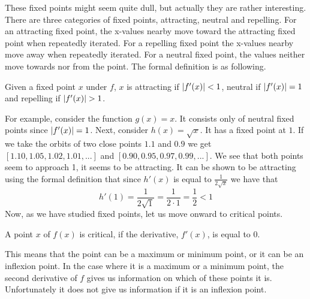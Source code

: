 These fixed points might seem quite dull, but actually they are rather interesting. There are three categories of fixed points, attracting, neutral and repelling. For an attracting fixed point, the x-values nearby move toward the attracting fixed point when repeatedly iterated. For a repelling fixed point the x-values nearby move away when repeatedly iterated. For a neutral fixed point, the values neither move towards nor from the point. The formal definition is as following.

\begin{definition}
Given a fixed point $x$ under $f$, $x$ is attracting if $\abs{f'(x)}<1$, neutral if $\abs{f'(x)}=1$ and repelling if $\abs{f'(x)}>1$.
\end{definition}
\noindent
For example, consider the function $g(x)=x$. It consists only of neutral fixed points since $\abs{f'(x)}=1$. Next, consider $h(x)=\sqrt{x}$. It has a fixed point at $1$. If we take the orbits of two close points $1.1$ and $0.9$ we get $[1.10,1.05,1.02,1.01,...]$ and $[0.90,0.95,0.97,0.99,...]$. We see that both points seem to approach 1, it seems to be attracting. It can be shown to be attracting using the formal definition that since $h'(x)$ is equal to $\frac{1}{2\sqrt{x}}$ we have that
\[h'(1)=\frac{1}{2\sqrt{1}}=\frac{1}{2\cdot1}=\frac{1}{2}<1\]
%
Now, as we have studied fixed points, let us move onward to critical points. 
\begin{definition}
A point $x$ of $f(x)$ is critical, if the derivative, $f'(x)$, is equal to $0$. %
\end{definition}
This means that the point can be a maximum or minimum point, or it can be an inflexion point. In the case where it is a maximum or a minimum point, the second derivative of $f$ gives us information on which of these points it is. Unfortunately it does not give us information if it is an inflexion point.

%
